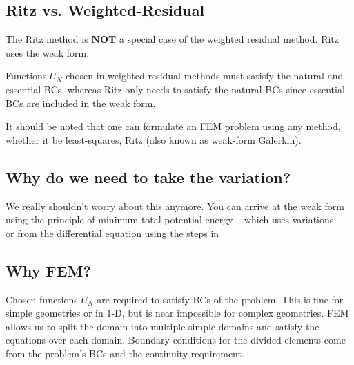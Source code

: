 \documentclass{article}
\begin{document}
\subsection{Ritz vs. Weighted-Residual}
The Ritz method is \textbf{NOT} a special case of the weighted residual method. Ritz uses
the weak form.

Functions $U_N$ chosen in weighted-residual methods must satisfy the natural and essential BCs,
whereas Ritz only needs to satisfy the natural BCs since essential BCs are included in the
weak form.

It should be noted that one can formulate an FEM problem using any method, whether it be
least-squares, Ritz (also known as weak-form Galerkin).

\subsection{Why do we need to take the variation?}
We really shouldn't worry about this anymore. You can arrive at the weak form using
the principle of minimum total potential energy -- which uses variations -- or from the
differential equation using the steps in~

\subsection{Why FEM?}
Chosen functions $U_N$ are required to satisfy BCs of the problem. This is fine for simple
geometries or in 1-D, but is near impossible for complex geometries. FEM allows us to split
the domain into multiple simple domains and satisfy the equations over each domain. Boundary
conditions for the divided elements come from the problem's BCs and the continuity requirement.
\end{document}
